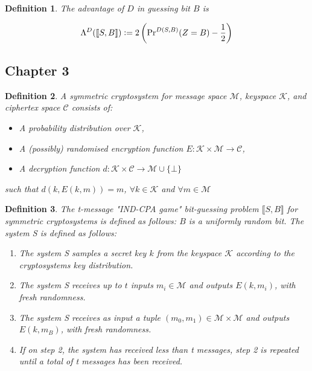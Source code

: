 \documentclass[a4paper,german]{article}
\newtheorem{definition}{Definition}
\begin{document}
\begin{definition}
	The advantage of $D$ in guessing bit $B$ is

	\[
		\Lambda^D(\llbracket S,B\rrbracket) \vcentcolon= 2\left( \Pr\nolimits^{D(S,B)}(Z = B) - \frac{1}{2}\right)
	\]
\end{definition}

\subsection*{Chapter 3}

\begin{definition}
	A symmetric cryptosystem for message space $\mathcal{M}$, keyspace  $\mathcal{K}$, and ciphertex space $\mathcal{C}$ consists of:

	\begin{itemize}
	
		\item  A probability distribution over $\mathcal{K}$,
		\item  A (possibly) randomised encryption function $E: \mathcal{K} \times \mathcal{M} \rightarrow \mathcal{C}$,
		\item  A decryption function $d: \mathcal{K} \times \mathcal{C} \rightarrow \mathcal{M} \cup \{\bot\}$
	
	\end{itemize}

	such that $d(k, E(k, m)) = m$, $\forall k \in \mathcal{K}$ and $\forall m \in \mathcal{M}$
\end{definition}

\begin{definition}
	The \emph{t-message} "IND-CPA game" bit-guessing problem $\llbracket S, B\rrbracket$ for symmetric cryptosystems is defined as follows: $B$ is a uniformly random bit. The system S is defined as follows:

	\begin{enumerate}
	
		\item  The system S samples a secret key $k$ from the keyspace $\mathcal{K}$ according to the cryptosystems key distribution.
		\item  The system S receives up to $t$ inputs $m_i \in \mathcal{M}$ and outputs $E(k, m_i)$, with fresh randomness.
		\item  The system S receives as input a tuple $(m_0, m_1) \in \mathcal{M} \times \mathcal{M}$ and outputs  $E(k, m_B)$, with fresh randomness.
		 \item If on step 2, the system has received less than t messages, step 2 is repeated until a total of t messages has been received.
	
	\end{enumerate}
\end{definition}
\end{document}
